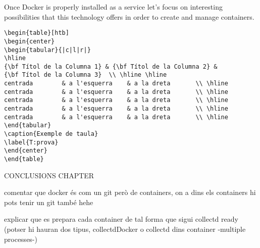Once Docker is properly installed as a service let's focus on interesting possibilities that this technology offers in order to create and manage containers.

\begin{verbatim}
\begin{table}[htb]
\begin{center}
\begin{tabular}{|c|l|r|}
\hline
{\bf Títol de la Columna 1} & {\bf Títol de la Columna 2} & 
{\bf Títol de la Columna 3}  \\ \hline \hline
centrada        & a l'esquerra    & a la dreta       \\ \hline
centrada        & a l'esquerra    & a la dreta       \\ \hline
centrada        & a l'esquerra    & a la dreta       \\ \hline
centrada        & a l'esquerra    & a la dreta       \\ \hline
centrada        & a l'esquerra    & a la dreta       \\ \hline
\end{tabular}
\caption{Exemple de taula}
\label{T:prova}
\end{center}
\end{table}
\end{verbatim}




CONCLUSIONS CHAPTER

comentar que docker és com un git però de containers, on a dins els containers hi pots tenir un git també hehe

explicar que es prepara cada container de tal forma que sigui collectd ready (potser hi hauran dos tipus, collectdDocker o collectd dins container -multiple processes-)

